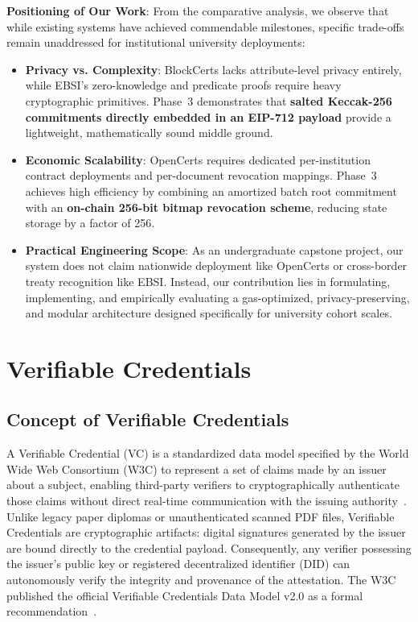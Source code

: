 \textbf{Positioning of Our Work}:
From the comparative analysis, we observe that while existing systems have achieved commendable milestones, specific trade-offs remain unaddressed for institutional university deployments:
\begin{itemize}
    \item \textbf{Privacy vs. Complexity}: BlockCerts lacks attribute-level privacy entirely, while EBSI's zero-knowledge and predicate proofs require heavy cryptographic primitives. Phase~3 demonstrates that \textbf{salted Keccak-256 commitments directly embedded in an EIP-712 payload} provide a lightweight, mathematically sound middle ground.
    \item \textbf{Economic Scalability}: OpenCerts requires dedicated per-institution contract deployments and per-document revocation mappings. Phase~3 achieves high efficiency by combining an amortized batch root commitment with an \textbf{on-chain 256-bit bitmap revocation scheme}, reducing state storage by a factor of 256.
    \item \textbf{Practical Engineering Scope}: As an undergraduate capstone project, our system does not claim nationwide deployment like OpenCerts or cross-border treaty recognition like EBSI. Instead, our contribution lies in formulating, implementing, and empirically evaluating a gas-optimized, privacy-preserving, and modular architecture designed specifically for university cohort scales.
\end{itemize}

\section{Verifiable Credentials}

\subsection{Concept of Verifiable Credentials}

A Verifiable Credential (VC) is a standardized data model specified by the World Wide Web Consortium (W3C) to represent a set of claims made by an issuer about a subject, enabling third-party verifiers to cryptographically authenticate those claims without direct real-time communication with the issuing authority~\cite{W3CVC}. Unlike legacy paper diplomas or unauthenticated scanned PDF files, Verifiable Credentials are cryptographic artifacts: digital signatures generated by the issuer are bound directly to the credential payload. Consequently, any verifier possessing the issuer's public key or registered decentralized identifier (DID) can autonomously verify the integrity and provenance of the attestation. The W3C published the official Verifiable Credentials Data Model v2.0 as a formal recommendation~\cite{W3CVC}.

